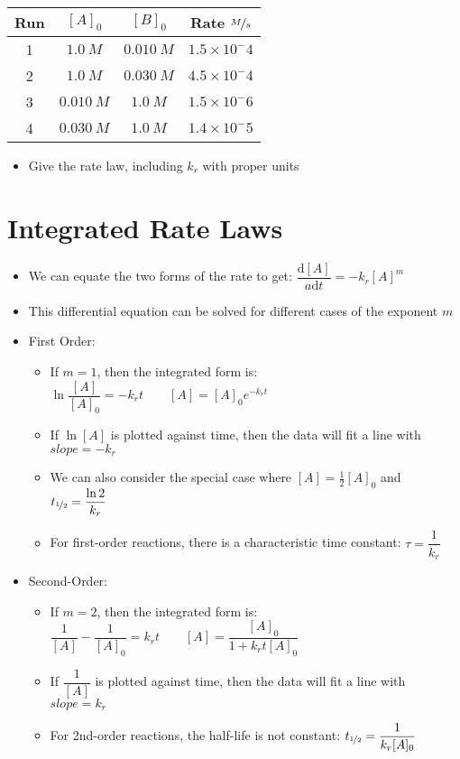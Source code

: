 \documentclass[12pt, openany, letterpaper]{memoir}
\begin{document}
\begin{tabular}{c|c|c|c}
	Run & $[A]_0$   & $[B]_0$   & Rate $\nicefrac{M}{s}$ \\ \midrule \midrule
	1   & $1.0~M$   & $0.010~M$ & $1.5\times10^-4$       \\ \midrule
	2   & $1.0~M$   & $0.030~M$ & $4.5\times10^-4$       \\ \midrule
	3   & $0.010~M$ & $1.0~M$   & $1.5\times10^-6$       \\ \midrule
	4   & $0.030~M$ & $1.0~M$   & $1.4\times10^-5$       \\
\end{tabular}
\begin{itemize}
	\item Give the rate law, including $k_r$ with proper units
\end{itemize}
\section{Integrated Rate Laws}
\begin{itemize}
	\item We can equate the two forms of the rate to get: $\dfrac{\mathrm{d}[A]}{a\mathrm{d}t} = -k_r[A]^m$
	\item This differential equation can be solved for different cases of the exponent $m$
	\item First Order:
	      \begin{itemize}
		      \item If $m=1$, then the integrated form is: $\ln \dfrac{[A]}{[A]_0}=-k_rt \hspace{2em} [A]=[A]_0e^{-k_rt}$
		      \item If $\ln [A]$ is plotted against time, then the data will fit a line with $slope = -k_r$
		      \item We can also consider the special case where $[A] = \frac{1}{2}[A]_0$ and $t_{\nicefrac{1}{2}} = \dfrac{\ln 2}{k_r}$
		      \item For first-order reactions, there is a characteristic time constant: $\tau = \dfrac{1}{k_r}$
	      \end{itemize}
	\item Second-Order:
	      \begin{itemize}
		      \item If $m=2$, then the integrated form is: $\dfrac{1}{[A]}-\dfrac{1}{[A]_0} = k_rt \hspace{2em} [A] = \dfrac{[A]_0}{1+k_rt[A]_0}$
		      \item If $\dfrac{1}{[A]}$ is plotted against time, then the data will fit a line with $slope=k_r$
		      \item For 2nd-order reactions, the half-life is not constant: $t_{\nicefrac{1}{2}}=\dfrac{1}{k_r[A]_0}$
	      \end{itemize}
\end{itemize}
\end{document}
